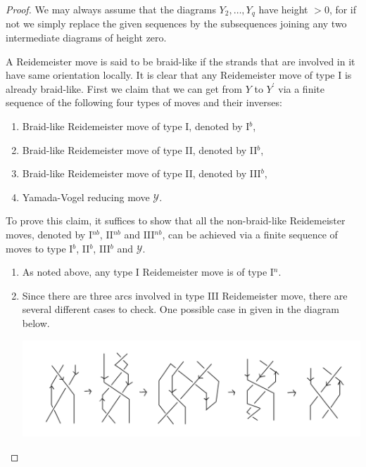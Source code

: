\begin{proof}
  We may always assume that the diagrams $Y_2, \ldots, Y_q$ have height $> 0$, for if not we simply replace the given sequences by the subsequences joining any two intermediate diagrams of height zero.
  
  A Reidemeister move is said to be braid-like if the strands that are involved in it have same orientation locally. It is clear that any Reidemeister move of type I is already braid-like. First we claim that we can get from $Y$ to $Y^{\prime}$ via a finite sequence of the following four types of moves and their inverses: 
\begin{enumerate}
\item\label{item:1} Braid-like Reidemeister move of type I, denoted by I$^b$, 
\item\label{item:2} Braid-like Reidemeister move of type II, denoted by II$^b$,
\item\label{item:3} Braid-like Reidemeister move of type II, denoted by III$^b$,
\item\label{item:4} Yamada-Vogel reducing move $\mathcal{Y}$.
\end{enumerate}

To prove this claim, it suffices to show that all the non-braid-like Reidemeister moves, denoted by I$^{nb}$, II$^{nb}$ and III$^{nb}$, can be achieved via a finite sequence of moves to type I$^b$, II$^{b}$, III$^b$ and $\mathcal{Y}$. 
\begin{enumerate}
\item\label{item:5} As noted above, any type I Reidemeister move is of type I$^n$. 
\item\label{item:11} Since there are three arcs involved in type III Reidemeister move, there are several different cases to check. One possible case in given in the diagram below.

\begin{center}
 \includegraphics[scale=.25]{images/5.png}
\end{center}


\end{enumerate}
\end{proof}
